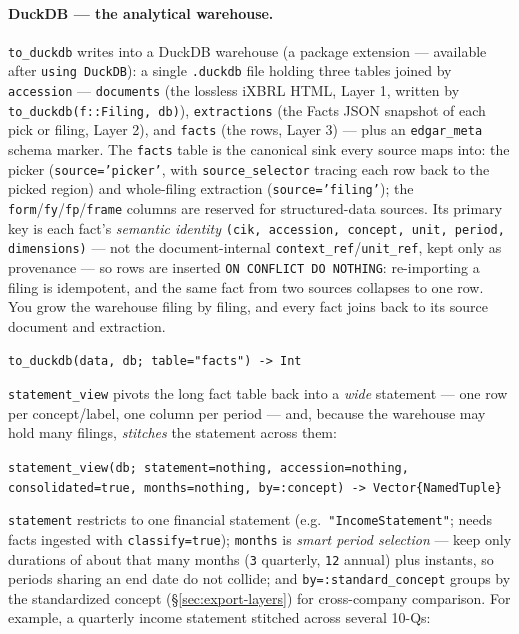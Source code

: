 \documentclass[11pt,a4paper]{report}
\newcommand{\sig}[1]{\medskip\noindent\texttt{#1}\par\medskip}
\begin{document}
\paragraph{DuckDB --- the analytical warehouse.} \texttt{to\_duckdb} writes into a DuckDB
warehouse (a package extension --- available after \texttt{using DuckDB}): a single
\texttt{.duckdb} file holding three tables joined by \texttt{accession} ---
\texttt{documents} (the lossless iXBRL HTML, Layer 1, written by
\texttt{to\_duckdb(f::Filing, db)}), \texttt{extractions} (the Facts JSON snapshot of each
pick or filing, Layer 2), and \texttt{facts} (the rows, Layer 3) --- plus an
\texttt{edgar\_meta} schema marker. The \texttt{facts} table is the canonical sink every
source maps into: the picker (\texttt{source='picker'}, with \texttt{source\_selector}
tracing each row back to the picked region) and whole-filing extraction
(\texttt{source='filing'}); the \texttt{form}/\texttt{fy}/\texttt{fp}/\texttt{frame} columns
are reserved for structured-data sources. Its primary key is each fact's \emph{semantic
identity} \texttt{(cik, accession, concept, unit, period, dimensions)} --- not the
document-internal \texttt{context\_ref}/\texttt{unit\_ref}, kept only as provenance --- so
rows are inserted \texttt{ON CONFLICT DO NOTHING}: re-importing a filing is idempotent, and
the same fact from two sources collapses to one row. You grow the warehouse filing by filing,
and every fact joins back to its source document and extraction.

\sig{to\_duckdb(data, db; table="facts") -> Int}

\noindent \texttt{statement\_view} pivots the long fact table back into a \emph{wide}
statement --- one row per concept/label, one column per period --- and, because the warehouse
may hold many filings, \emph{stitches} the statement across them:

\sig{statement\_view(db; statement=nothing, accession=nothing, consolidated=true, months=nothing, by=:concept) -> Vector\{NamedTuple\}}

\noindent \texttt{statement} restricts to one financial statement (e.g.\ \texttt{"IncomeStatement"};
needs facts ingested with \texttt{classify=true}); \texttt{months} is \emph{smart period
selection} --- keep only durations of about that many months (\texttt{3} quarterly, \texttt{12}
annual) plus instants, so periods sharing an end date do not collide; and
\texttt{by=:standard\_concept} groups by the standardized concept (\S\ref{sec:export-layers}) for
cross-company comparison. For example, a quarterly income statement stitched across several
10-Qs:
\end{document}
